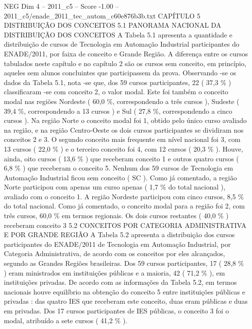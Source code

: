 \begin{textsample}{NEG Dim 4 – 2011\_c5 – Score -1.00 – 2011\_c5/enade\_2011\_tec\_autom\_c60e876b3b.txt}  \label{ex:f4_neg_117}
CAPÍTULO 5 DISTRIBUIÇÃO DOS CONCEITOS 5.1 PANORAMA NACIONAL DA DISTRIBUIÇÃO DOS CONCEITOS A Tabela 5.1 apresenta a quantidade e distribuição de cursos de Tecnologia em Automação Industrial participantes do ENADE/2011, por faixa de conceito e Grande Região.
A diferença entre os cursos tabulados neste capítulo e no capítulo 2 são os cursos sem conceito, em princípio, aqueles sem alunos concluintes que participassem da prova.
Observando -se os dados da Tabela 5.1, nota -se que, dos 59 cursos participantes, 22 ( 37,3 \% ) classificaram -se com conceito 2, o valor modal.
Este foi também o conceito modal nas regiões Nordeste ( 60,0 \%, correspondendo a três cursos ), Sudeste ( 39,4 \%, correspondendo a 13 cursos ) e Sul ( 27,8 \%, correspondendo a cinco cursos ).
Na região Norte o conceito modal foi 1, obtido pelo único curso avaliado na região, e na região Centro-Oeste os dois cursos participantes se dividiram nos conceitos 2 e 3.
O segundo conceito mais frequente em nível nacional foi 3, com 13 cursos ( 22,0 \% ) e o terceiro conceito foi 4, com 12 cursos ( 20,3 \% ).
Houve, ainda, oito cursos ( 13,6 \% ) que receberam conceito 1 e outros quatro cursos ( 6,8 \% ) que receberam o conceito 5.
Nenhum dos 59 cursos de Tecnologia em Automação Industrial ficou sem conceito ( SC ).
Como já comentado, a região Norte participou com apenas um curso apenas ( 1,7 \% do total nacional ), avaliado com o conceito 1.
A região Nordeste participou com cinco cursos, 8,5 \% do total nacional.
Como já comentado, o conceito modal para a região foi 2, com três cursos, 60,0 \% em termos regionais.
Os dois cursos restantes ( 40,0 \% ) receberam conceito 3 5.2 CONCEITOS POR CATEGORIA ADMINISTRATIVA E POR GRANDE REGIÃO A Tabela 5.2 apresenta a distribuição dos cursos participantes do ENADE/2011 de Tecnologia em Automação Industrial, por Categoria Administrativa, de acordo com os conceitos por eles alcançados, segundo as Grandes Regiões brasileiras.
Dos 59 cursos participantes, 17 ( 28,8 \% ) eram ministrados em instituições públicas e a maioria, 42 ( 71,2 \% ), em instituições privadas.
De acordo com as informações da Tabela 5.2, em termos nacionais houve equilíbrio na obtenção do conceito 5 entre instituições públicas e privadas : das quatro IES que receberam este conceito, duas eram públicas e duas em privadas.
Dos 17 cursos participantes de IES públicas, o conceito 3 foi o modal, atribuído a sete cursos ( 41,2 \% ).

\end{textsample}
